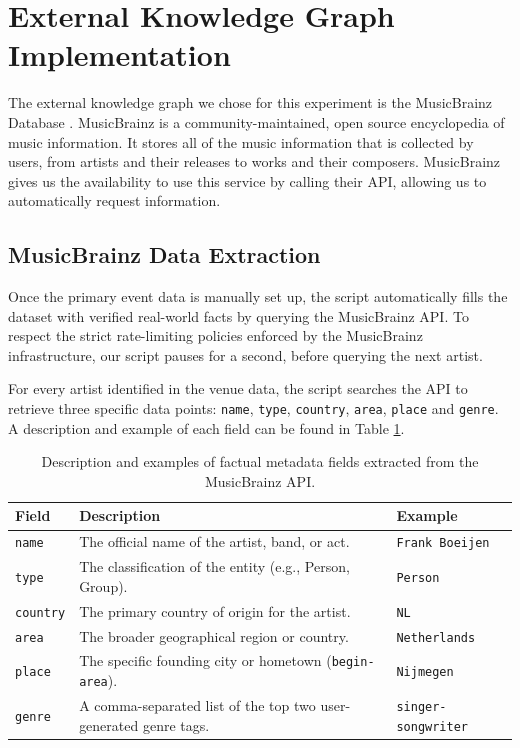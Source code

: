 \section{External Knowledge Graph Implementation}
The external knowledge graph we chose for this experiment is the MusicBrainz Database \cite{musicbrainz}.
MusicBrainz is a community-maintained, open source encyclopedia of music information. It stores all of the music information that is collected by users, from artists and their releases to works and their composers. MusicBrainz gives us the availability to use this service by calling their API, allowing us to automatically request information. 


\subsection{MusicBrainz Data Extraction}
Once the primary event data is manually set up, the script automatically fills the dataset with verified real-world facts by querying the MusicBrainz API. To respect the strict rate-limiting policies enforced by the MusicBrainz infrastructure, our script pauses for a second, before querying the next artist. 

For every artist identified in the venue data, the script searches the API to retrieve three specific data points: 
\texttt{name}, \texttt{type}, \texttt{country}, \texttt{area}, \texttt{place} and \texttt{genre}. A description and example of each field can be found in Table \ref{tab:musicbrainz_facts}.

\begin{table}[htbp]
    \centering
    \renewcommand{\arraystretch}{1.2} %
    \begin{tabular}{@{}llp{4cm}@{}}
        \toprule
        \textbf{Field} & \textbf{Description} & \textbf{Example} \\
        \midrule
        \texttt{name} & The official name of the artist, band, or act. & \texttt{Frank Boeijen} \\
        \texttt{type} & The classification of the entity (e.g., Person, Group). & \texttt{Person} \\
        \texttt{country} & The primary country of origin for the artist. & \texttt{NL} \\
        \texttt{area} & The broader geographical region or country. & \texttt{Netherlands} \\
        \texttt{place} & The specific founding city or hometown (\texttt{begin-area}). & \texttt{Nijmegen} \\
        \texttt{genre} & A comma-separated list of the top two user-generated genre tags. &  \texttt{singer-songwriter}\\
        \bottomrule
    \end{tabular}
    \caption{Description and examples of factual metadata fields extracted from the MusicBrainz API.}
    \label{tab:musicbrainz_facts}
\end{table}

